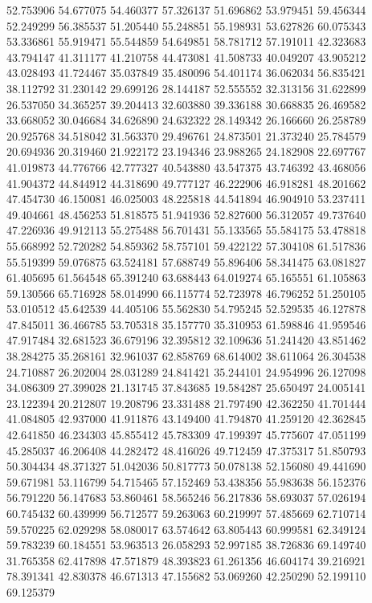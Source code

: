52.753906
54.677075
54.460377
57.326137
51.696862
53.979451
59.456344
52.249299
56.385537
51.205440
55.248851
55.198931
53.627826
60.075343
53.336861
55.919471
55.544859
54.649851
58.781712
57.191011
42.323683
43.794147
41.311177
41.210758
44.473081
41.508733
40.049207
43.905212
43.028493
41.724467
35.037849
35.480096
54.401174
36.062034
56.835421
38.112792
31.230142
29.699126
28.144187
52.555552
32.313156
31.622899
26.537050
34.365257
39.204413
32.603880
39.336188
30.668835
26.469582
33.668052
30.046684
34.626890
24.632322
28.149342
26.166660
26.258789
20.925768
34.518042
31.563370
29.496761
24.873501
21.373240
25.784579
20.694936
20.319460
21.922172
23.194346
23.988265
24.182908
22.697767
41.019873
44.776766
42.777327
40.543880
43.547375
43.746392
43.468056
41.904372
44.844912
44.318690
49.777127
46.222906
46.918281
48.201662
47.454730
46.150081
46.025003
48.225818
44.541894
46.904910
53.237411
49.404661
48.456253
51.818575
51.941936
52.827600
56.312057
49.737640
47.226936
49.912113
55.275488
56.701431
55.133565
55.584175
53.478818
55.668992
52.720282
54.859362
58.757101
59.422122
57.304108
61.517836
55.519399
59.076875
63.524181
57.688749
55.896406
58.341475
63.081827
61.405695
61.564548
65.391240
63.688443
64.019274
65.165551
61.105863
59.130566
65.716928
58.014990
66.115774
52.723978
46.796252
51.250105
53.010512
45.642539
44.405106
55.562830
54.795245
52.529535
46.127878
47.845011
36.466785
53.705318
35.157770
35.310953
61.598846
41.959546
47.917484
32.681523
36.679196
32.395812
32.109636
51.241420
43.851462
38.284275
35.268161
32.961037
62.858769
68.614002
38.611064
26.304538
24.710887
26.202004
28.031289
24.841421
35.244101
24.954996
26.127098
34.086309
27.399028
21.131745
37.843685
19.584287
25.650497
24.005141
23.122394
20.212807
19.208796
23.331488
21.797490
42.362250
41.701444
41.084805
42.937000
41.911876
43.149400
41.794870
41.259120
42.362845
42.641850
46.234303
45.855412
45.783309
47.199397
45.775607
47.051199
45.285037
46.206408
44.282472
48.416026
49.712459
47.375317
51.850793
50.304434
48.371327
51.042036
50.817773
50.078138
52.156080
49.441690
59.671981
53.116799
54.715465
57.152469
53.438356
55.983638
56.152376
56.791220
56.147683
53.860461
58.565246
56.217836
58.693037
57.026194
60.745432
60.439999
56.712577
59.263063
60.219997
57.485669
62.710714
59.570225
62.029298
58.080017
63.574642
63.805443
60.999581
62.349124
59.783239
60.184551
53.963513
26.058293
52.997185
38.726836
69.149740
31.765358
62.417898
47.571879
48.393823
61.261356
46.604174
39.216921
78.391341
42.830378
46.671313
47.155682
53.069260
42.250290
52.199110
69.125379
